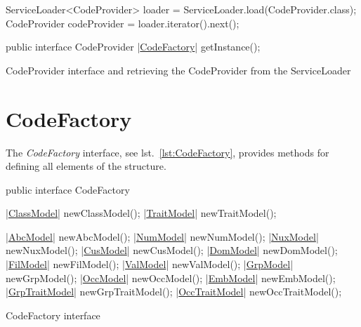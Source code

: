 \documentclass[a4paper,10pt]{report}
\newenvironment{elisting}[1][H]
  {\captionsetup{aboveskip=0pt}\begin{listing}[#1]}
  {\end{listing}%
}
\begin{document}
\begin{elisting}[!htb]
\begin{javacode}
      ServiceLoader<CodeProvider> loader = ServiceLoader.load(CodeProvider.class);
      CodeProvider codeProvider = loader.iterator().next();
\end{javacode}
\vspace*{-1cm}
\begin{javacode}
public interface CodeProvider {
     |\hyperref[lst:CodeFactory]{CodeFactory}| getInstance();
}
\end{javacode}
\caption{CodeProvider interface and retrieving the CodeProvider from the ServiceLoader}
\label{lst:CodeProvider}
\end{elisting}


\section{CodeFactory}
The \textsl{CodeFactory} interface, see lst.~\ref{lst:CodeFactory}, provides 
methods for defining all elements of the structure.

\begin{elisting}[!htb]
\begin{javacode}
public interface CodeFactory {
    |\hyperref[lst:ClassModel]{ClassModel}| newClassModel();
    |\hyperref[lst:TraitModel]{TraitModel}| newTraitModel();

    |\hyperref[lst:AbcModel]{AbcModel}| newAbcModel();
    |\hyperref[lst:NumModel]{NumModel}| newNumModel();
    |\hyperref[lst:NuxModel]{NuxModel}| newNuxModel();
    |\hyperref[lst:CusModel]{CusModel}| newCusModel();
    |\hyperref[lst:DomModel]{DomModel}| newDomModel();
    |\hyperref[lst:FilModel]{FilModel}| newFilModel();
    |\hyperref[lst:ValModel]{ValModel}| newValModel();
    |\hyperref[lst:GrpModel]{GrpModel}| newGrpModel();
    |\hyperref[lst:OccModel]{OccModel}| newOccModel();
    |\hyperref[lst:EmbModel]{EmbModel}| newEmbModel();
    |\hyperref[lst:GrpTraitModel]{GrpTraitModel}| newGrpTraitModel();
    |\hyperref[lst:OccTraitModel]{OccTraitModel}| newOccTraitModel();
}
\end{javacode}
\caption{CodeFactory interface}
\label{lst:CodeFactory}
\end{elisting}
\end{document}
